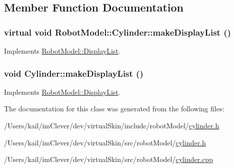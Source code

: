 \subsection{Member Function Documentation}
\hypertarget{class_robot_model_1_1_cylinder_a92e328e0a01f4fd787d73d4996d67b0a}{
\subsubsection[{makeDisplayList}]{\setlength{\rightskip}{0pt plus 5cm}virtual void RobotModel::Cylinder::makeDisplayList ()}}
\label{class_robot_model_1_1_cylinder_a92e328e0a01f4fd787d73d4996d67b0a}


Implements \hyperlink{class_robot_model_1_1_display_list_a842de97924298c7363e50aebd69e5a50}{RobotModel::DisplayList}.\hypertarget{class_robot_model_1_1_cylinder_a9f0361117d5f20344f543c9e20df1113}{
\subsubsection[{makeDisplayList}]{\setlength{\rightskip}{0pt plus 5cm}void Cylinder::makeDisplayList ()}}
\label{class_robot_model_1_1_cylinder_a9f0361117d5f20344f543c9e20df1113}


Implements \hyperlink{class_robot_model_1_1_display_list_a842de97924298c7363e50aebd69e5a50}{RobotModel::DisplayList}.

The documentation for this class was generated from the following files:\begin{DoxyCompactItemize}
\item 
/Users/kail/imClever/dev/virtualSkin/include/robotModel/\hyperlink{include_2robot_model_2cylinder_8h}{cylinder.h}\item 
/Users/kail/imClever/dev/virtualSkin/src/robotModel/\hyperlink{src_2robot_model_2cylinder_8h}{cylinder.h}\item 
/Users/kail/imClever/dev/virtualSkin/src/robotModel/\hyperlink{cylinder_8cpp}{cylinder.cpp}\end{DoxyCompactItemize}

